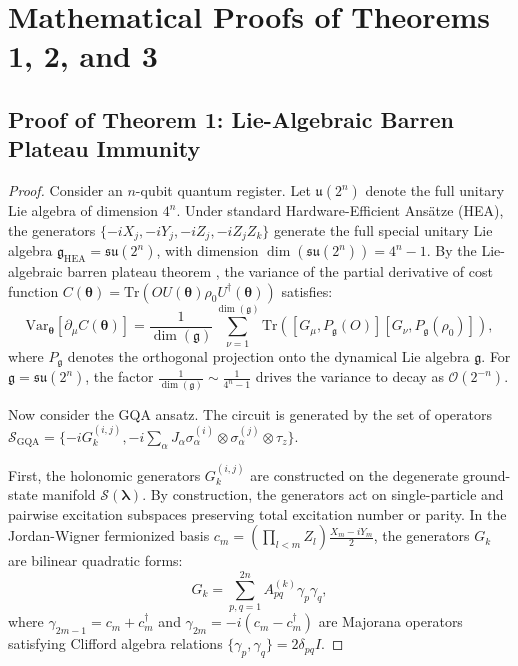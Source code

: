 \documentclass{article}
\begin{document}



\appendix
\section{Mathematical Proofs of Theorems 1, 2, and 3}
\label{sec:appendix_proofs}

\subsection{Proof of Theorem 1: Lie-Algebraic Barren Plateau Immunity}
\label{sec:proof_thm1}

\begin{proof}
Consider an $n$-qubit quantum register. Let $\mathfrak{u}(2^n)$ denote the full unitary Lie algebra of dimension $4^n$. Under standard Hardware-Efficient Ans\"atze (HEA), the generators $\{ -i X_j, -i Y_j, -i Z_j, -i Z_j Z_k \}$ generate the full special unitary Lie algebra $\mathfrak{g}_{\mathrm{HEA}} = \mathfrak{su}(2^n)$, with dimension $\dim(\mathfrak{su}(2^n)) = 4^n - 1$. By the Lie-algebraic barren plateau theorem \citep{Larocca2024BarrenPlateaus}, the variance of the partial derivative of cost function $C(\boldsymbol{\theta}) = \mathrm{Tr}(O U(\boldsymbol{\theta}) \rho_0 U^\dagger(\boldsymbol{\theta}))$ satisfies:
\begin{equation}
\mathrm{Var}_{\boldsymbol{\theta}}[\partial_\mu C(\boldsymbol{\theta})] = \frac{1}{\dim(\mathfrak{g})} \sum_{\nu=1}^{\dim(\mathfrak{g})} \mathrm{Tr}\left( [G_\mu, P_{\mathfrak{g}}(O)] [G_\nu, P_{\mathfrak{g}}(\rho_0)] \right),
\label{eq:lie_variance_formula}
\end{equation}
where $P_{\mathfrak{g}}$ denotes the orthogonal projection onto the dynamical Lie algebra $\mathfrak{g}$. For $\mathfrak{g} = \mathfrak{su}(2^n)$, the factor $\frac{1}{\dim(\mathfrak{g})} \sim \frac{1}{4^n - 1}$ drives the variance to decay as $\mathcal{O}(2^{-n})$.

Now consider the GQA ansatz. The circuit is generated by the set of operators $\mathcal{S}_{\mathrm{GQA}} = \{ -i G_k^{(i, j)}, -i \sum_{\alpha} J_\alpha \sigma_\alpha^{(i)} \otimes \sigma_\alpha^{(j)} \otimes \tau_z \}$. 

First, the holonomic generators $G_k^{(i, j)}$ are constructed on the degenerate ground-state manifold $\mathcal{S}(\boldsymbol{\lambda})$. By construction, the generators act on single-particle and pairwise excitation subspaces preserving total excitation number or parity. In the Jordan-Wigner fermionized basis $c_m = \left(\prod_{l < m} Z_l\right) \frac{X_m - i Y_m}{2}$, the generators $G_k$ are bilinear quadratic forms:
\begin{equation}
G_k = \sum_{p, q=1}^{2n} A_{pq}^{(k)} \gamma_p \gamma_q,
\label{eq:majorana_bilinear}
\end{equation}
where $\gamma_{2m-1} = c_m + c_m^\dagger$ and $\gamma_{2m} = -i(c_m - c_m^\dagger)$ are Majorana operators satisfying Clifford algebra relations $\{\gamma_p, \gamma_q\} = 2 \delta_{pq} I$.


\end{proof}
\end{document}
